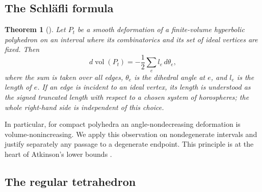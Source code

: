 \documentclass[12pt,a4paper]{article}
\newtheorem{theorem}{Theorem}[section]
\theoremstyle{definition}
\DeclareMathOperator{\Vol}{vol}
\begin{document}
\subsection{The Schl\"afli formula}

\begin{theorem}[{\cite[Theorem~9]{Atkinson2011}}]\label{thm:schlafli}
Let \(P_t\) be a smooth deformation of a finite-volume hyperbolic polyhedron on an interval where its combinatorics and its set of ideal vertices are fixed. Then
\begin{equation}\label{eq:schlafli}
        d\Vol(P_t)=-\frac12\sum_e l_e\,d\theta_e,
\end{equation}
where the sum is taken over all edges, \(\theta_e\) is the dihedral angle at \(e\), and \(l_e\) is the length of \(e\). If an edge is incident to an ideal vertex, its length is understood as the signed truncated length with respect to a chosen system of horospheres; the whole right-hand side is independent of this choice.
\end{theorem}

In particular, for compact polyhedra an angle-nondecreasing deformation is
volume-nonincreasing. We apply this observation on nondegenerate intervals
and justify separately any passage to a degenerate endpoint. This principle
is at the heart of Atkinson's lower bounds \cite{Atkinson2011}.

\subsection{The regular tetrahedron}
\end{document}
